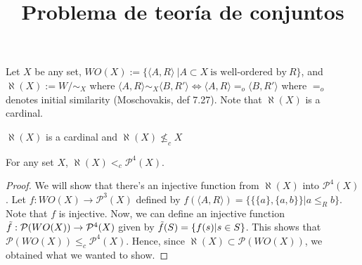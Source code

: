 \documentclass{article}
\title{Problema de teoría de conjuntos}
\begin{document}
\begin{definition}
    Let $X$ be any set, $WO(X):=\{\langle A,R\rangle\ |A\subset X \ \text{is well-ordered by}\ R\}$, and $\aleph(X):= W/{\sim_X}$ where $\langle A,R\rangle \sim_X \langle B, R'\rangle \Longleftrightarrow \langle A, R\rangle =_o \langle B, R'\rangle$ where $=_o$ denotes initial similarity (Moschovakis, def 7.27). Note that $\aleph(X)$ is a cardinal.
\end{definition}
\begin{claim}
    $\aleph(X)$ is a cardinal and $\aleph(X)\nleq_c X$
\end{claim}
\begin{theorem}
For any set $X$, $\aleph(X)<_c \mathcal{P}^4(X)$.
\end{theorem}
\begin{proof}
We will show that there's an injective function from $\aleph(X)$ into $\mathcal{P}^4(X)$. Let $f:WO(X)\rightarrow \mathcal{P}^3(X)$ defined by $f(\langle A,R\rangle) = \{\{\{a\},\{a,b\}\}| a\leq_R b\}$. Note that $f$ is injective. Now, we can define an injective function $\Tilde{f}: \mathcal{P} (WO(X)) \rightarrow \mathcal{P}^4(X)$ given by $\Tilde{f}(S) = \{f(s) | s\in S\}$. This shows that $\mathcal{P} (WO(X)) \leq_c \mathcal{P}^4(X)$. Hence, since $\aleph (X) \subset \mathcal{P} (WO(X))$, we obtained what we wanted to show.
\end{proof}
\end{document}
